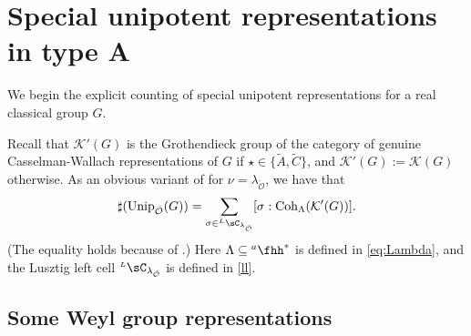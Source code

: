 \documentclass[12pt]{amsart}
\def\subset{\subseteq}
\newcommand{\CK}{{\mathcal {K}}}
\newcommand{\CO}{{\mathcal {O}}}
\newcommand{\g}{\mathfrak g}
\newcommand{\be}{\begin {equation}}
\newcommand{\ee}{\end {equation}}
\numberwithin{equation}{section}
\theoremstyle{remark}
\newtheorem{remark}[thm]{Remark}
\def\Unip{\mathrm{Unip}}
\def\dBV{d_{\mathrm{BV}}}
\def\hha{{}^a\fhh}
\def\LC{{}^{\scriptscriptstyle L}\sC}
\def\Coh{\mathrm{Coh}}
\def\Inn{\mathrm{Ad}}
\newcommand{\Lam}{{[\lambda]}}
\begin{document}


\section{Special unipotent representations in type A}\label{sec:GL}





We begin the explicit counting of special unipotent representations for a real classical group $G$.

Recall that $\CK'(G)$ is the Grothendieck group of the category of genuine Casselman-Wallach representations of $G$ if $\star\in \{\widetilde A, \widetilde C\}$, and $\CK'(G):=\CK(G)$ otherwise.
As an obvious variant of  for $\nu=\lambda_{\check \CO}$, we have that
 \begin{equation}\label{boundc22}
     \sharp(\Unip_{\check \CO}(G))
     =\sum_{\sigma\in \LC_{\lambda_{\check \CO}}} [\sigma: \Coh_{\Lambda}(\CK'(G))].
   \end{equation}
(The equality holds because of .) Here $\Lambda \subset \hha^*$ is defined in \eqref{eq:Lambda}, and the Lusztig left cell $\LC_{\lambda_{\check \CO}}$ is defined in \eqref{ll}.



\subsection{Some Weyl group representations}
\end{document}

